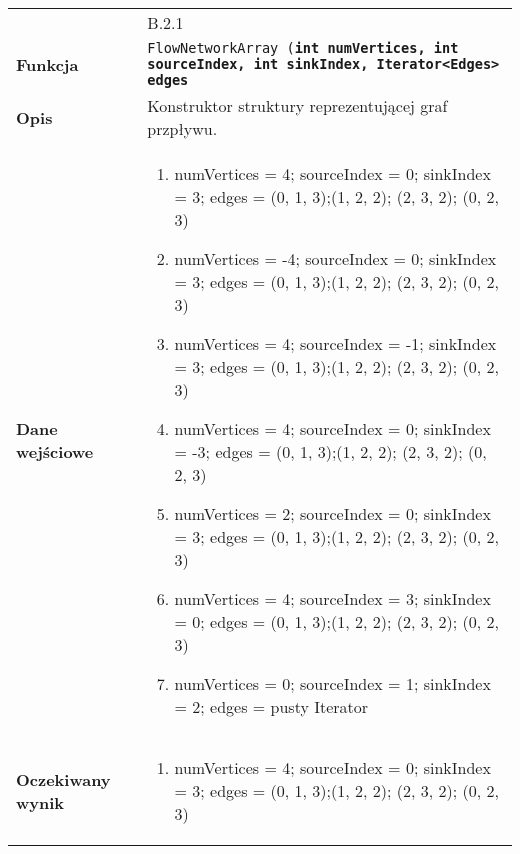 \begin{center}
\begin{tabular}{@{} >{\ttfamily}p{} @{\hspace{0.02\textwidth}} p{} @{}}
    \toprule
    \multicolumn{2}{@{}c@{}}{\bfseries{NetworkConstructorTest}} \\
    \midrule
    {\bfseries Id} & B.2.1 \\
    \hline
    {\bfseries Funkcja} & \texttt{FlowNetworkArray (\bfseries int numVertices, \bfseries int sourceIndex,
                                                    \bfseries int sinkIndex,
                                                    \bfseries Iterator<Edges> edges} \\
    \hline
    {\bfseries Opis} & Konstruktor struktury reprezentującej graf przpływu. \\
    \hline
    {\bfseries Dane wejściowe} & {\begin{enumerate}
                                        \item numVertices = 4; sourceIndex = 0; sinkIndex = 3;  edges =  (0, 1, 3);(1, 2, 2); (2, 3, 2); (0, 2, 3)
                                        \item numVertices = -4; sourceIndex = 0; sinkIndex = 3; edges =  (0, 1, 3);(1, 2, 2); (2, 3, 2); (0, 2, 3)
                                        \item numVertices = 4; sourceIndex = -1; sinkIndex = 3; edges =  (0, 1, 3);(1, 2, 2); (2, 3, 2); (0, 2, 3)
                                        \item numVertices = 4; sourceIndex = 0; sinkIndex = -3; edges =  (0, 1, 3);(1, 2, 2); (2, 3, 2); (0, 2, 3)
                                        \item numVertices = 2; sourceIndex = 0; sinkIndex = 3; edges =  (0, 1, 3);(1, 2, 2); (2, 3, 2); (0, 2, 3)
                                        \item numVertices = 4; sourceIndex = 3; sinkIndex = 0; edges =  (0, 1, 3);(1, 2, 2); (2, 3, 2); (0, 2, 3)
                                        \item numVertices = 0; sourceIndex = 1; sinkIndex = 2; edges =  pusty Iterator
                                    \end{enumerate}} \\
    \hline
    {\bfseries Oczekiwany wynik} & {\begin{enumerate}
                                        \item numVertices = 4; sourceIndex = 0; sinkIndex = 3;  edges =  (0, 1, 3);(1, 2, 2); (2, 3, 2); (0, 2, 3)

\end{enumerate}}
\end{tabular}
\end{center}
